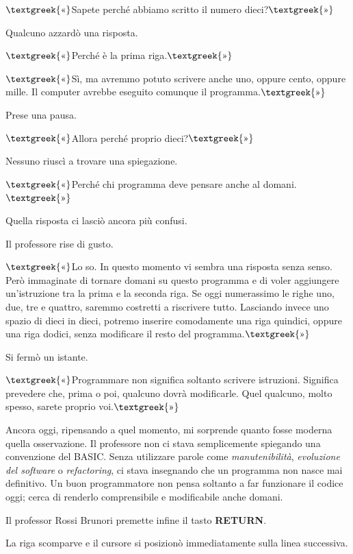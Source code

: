 \documentclass{article}
\begin{document}
$\text{\textgreek{«}}$Sapete perché abbiamo scritto il numero dieci?$\text{\textgreek{»}}$

Qualcuno azzardò una risposta.

$\text{\textgreek{«}}$Perché è la prima riga.$\text{\textgreek{»}}$

$\text{\textgreek{«}}$Sì, ma avremmo potuto scrivere anche uno, oppure cento, oppure mille. Il computer avrebbe eseguito
comunque il programma.$\text{\textgreek{»}}$

Prese una pausa.

$\text{\textgreek{«}}$Allora perché proprio dieci?$\text{\textgreek{»}}$

Nessuno riuscì a trovare una spiegazione.

$\text{\textgreek{«}}$Perché chi programma deve pensare anche al domani.$\text{\textgreek{»}}$

Quella risposta ci lasciò ancora più confusi.

Il professore rise di gusto.

$\text{\textgreek{«}}$Lo so. In questo momento vi sembra una risposta senza senso. Però immaginate di tornare domani su
questo programma e di voler aggiungere un'istruzione tra la prima e la seconda riga. Se oggi numerassimo le righe uno,
due, tre e quattro, saremmo costretti a riscrivere tutto. Lasciando invece uno spazio di dieci in dieci, potremo
inserire comodamente una riga quindici, oppure una riga dodici, senza modificare il resto del
programma.$\text{\textgreek{»}}$

Si fermò un istante.

$\text{\textgreek{«}}$Programmare non significa soltanto scrivere istruzioni. Significa prevedere che, prima o poi,
qualcuno dovrà modificarle. Quel qualcuno, molto spesso, sarete proprio voi.$\text{\textgreek{»}}$

Ancora oggi, ripensando a quel momento, mi sorprende quanto fosse moderna quella osservazione. Il professore non ci
stava semplicemente spiegando una convenzione del BASIC. Senza utilizzare parole come \emph{manutenibilità},
\emph{evoluzione del software} o \emph{refactoring}, ci stava insegnando che un programma non nasce mai definitivo. Un
buon programmatore non pensa soltanto a far funzionare il codice oggi; cerca di renderlo comprensibile e modificabile
anche domani.

Il professor Rossi Brunori premette infine il tasto \textbf{RETURN}.

La riga scomparve e il cursore si posizionò immediatamente sulla linea successiva.
\end{document}
